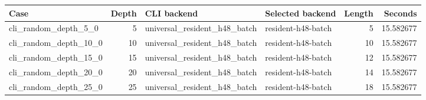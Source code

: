 {\small
\begin{tabular}{lrllrr}
\hline
Case & Depth & CLI backend & Selected backend & Length & Seconds \\
\hline
cli\_random\_depth\_5\_0 & 5 & universal\_resident\_h48\_batch & resident-h48-batch & 5 & 15.582677 \\
cli\_random\_depth\_10\_0 & 10 & universal\_resident\_h48\_batch & resident-h48-batch & 10 & 15.582677 \\
cli\_random\_depth\_15\_0 & 15 & universal\_resident\_h48\_batch & resident-h48-batch & 12 & 15.582677 \\
cli\_random\_depth\_20\_0 & 20 & universal\_resident\_h48\_batch & resident-h48-batch & 14 & 15.582677 \\
cli\_random\_depth\_25\_0 & 25 & universal\_resident\_h48\_batch & resident-h48-batch & 18 & 15.582677 \\
\hline
\end{tabular}
}
